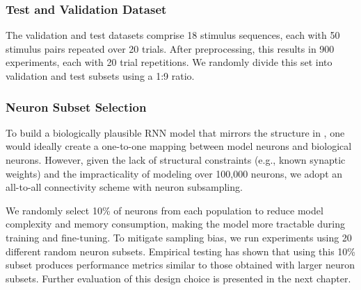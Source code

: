 \subsubsection{Test and Validation Dataset}
\label{subsubsec:test_dataset}

The validation and test datasets comprise 18 stimulus sequences, each with 50 stimulus pairs repeated over 20 trials. After preprocessing, this results in 900 experiments, each with 20 trial repetitions. We randomly divide this set into validation and test subsets using a 1:9 ratio.

\subsubsection{Neuron Subset Selection}
\label{subsubsec:subset_selection}

To build a biologically plausible RNN model that mirrors the structure in \citet{antolik2024comprehensive}, one would ideally create a one-to-one mapping between model neurons and biological neurons. However, given the lack of structural constraints (e.g., known synaptic weights) and the impracticality of modeling over 100,000 neurons, we adopt an all-to-all connectivity scheme with neuron subsampling.

We randomly select 10\% of neurons from each population to reduce model complexity and memory consumption, making the model more tractable during training and fine-tuning. To mitigate sampling bias, we run experiments using 20 different random neuron subsets. Empirical testing has shown that using this 10\% subset produces performance metrics similar to those obtained with larger neuron subsets. Further evaluation of this design choice is presented in the next chapter.
